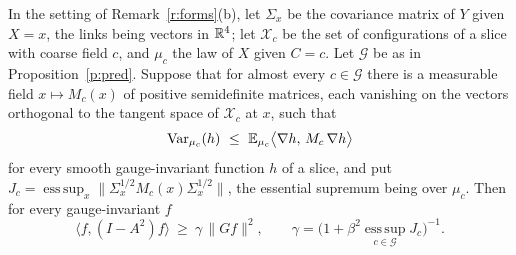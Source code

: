 \begin{proposition}\label{p:dir}
In the setting of Remark~\ref{r:forms}(b), let $\Sigma_x$ be the covariance matrix of $Y$ given $X=x$, the
links being vectors in $\mathbb{R}^4$; let $\mathcal X_c$ be the set of configurations of a slice with coarse field
$c$, and $\mu_c$ the law of $X$ given $C=c$. Let $\mathcal G$ be as in Proposition~\ref{p:pred}. Suppose that
for almost every $c\in\mathcal G$ there is a measurable field $x\mapsto M_c(x)$ of positive semidefinite
matrices, each vanishing on the vectors orthogonal to the tangent space of $\mathcal X_c$ at $x$, such that
\begin{equation}\label{e:wpi}
\operatorname{Var}_{\mu_c}(h)\ \le\ \mathbb{E}_{\mu_c}\big\langle\nabla h,\,M_c\,\nabla h\big\rangle
\end{equation}
for every smooth gauge-invariant function $h$ of a slice, and put
$J_c=\operatorname*{ess\,sup}_x\big\|\Sigma_x^{1/2}M_c(x)\Sigma_x^{1/2}\big\|$, the essential supremum being
over $\mu_c$. Then for every gauge-invariant $f$
\[
\langle f,(I-A^2)f\rangle\ \ge\ \gamma\,\|Gf\|^2,\qquad
\gamma=\Big(1+\beta^2\operatorname*{ess\,sup}_{c\in\mathcal G}J_c\Big)^{-1}.
\]
\end{proposition}
